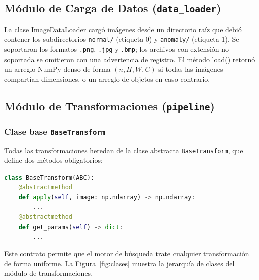 \documentclass[conference,spanish]{IEEEtran}
\begin{document}
\subsection{Módulo de Carga de Datos (\texttt{data\_loader})}

La clase ImageDataLoader cargó imágenes desde un directorio raíz
que debió contener los subdirectorios \texttt{normal/} (etiqueta 0) y
\texttt{anomaly/} (etiqueta 1). Se soportaron los formatos \texttt{.png},
\texttt{.jpg} y \texttt{.bmp}; los archivos con extensión no soportada se
omitieron con una advertencia de registro. El método
load() retornó un arreglo NumPy denso de forma $(n, H, W, C)$ si
todas las imágenes compartían dimensiones, o un arreglo de objetos en caso
contrario.

\subsection{Módulo de Transformaciones (\texttt{pipeline})}

\subsubsection{Clase base \texttt{BaseTransform}}

Todas las transformaciones heredan de la clase abstracta
\texttt{BaseTransform}, que define dos métodos obligatorios:

\begin{lstlisting}[language=Python]
class BaseTransform(ABC):
    @abstractmethod
    def apply(self, image: np.ndarray) -> np.ndarray:
        ...
    @abstractmethod
    def get_params(self) -> dict:
        ...
\end{lstlisting}

Este contrato permite que el motor de búsqueda trate cualquier
transformación de forma uniforme. La Figura~\ref{fig:clases} muestra la
jerarquía de clases del módulo de transformaciones.
\end{document}
